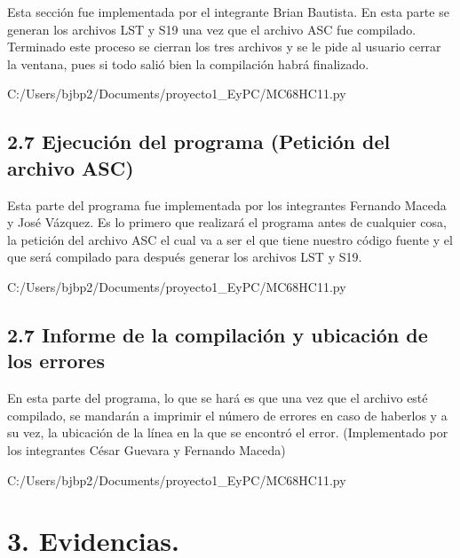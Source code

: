 \documentclass[letterpaper]{report}
\begin{document}
    Esta sección fue implementada por el integrante Brian Bautista. 
    En esta parte se generan los archivos LST y S19 una vez que el archivo ASC 
    fue compilado. Terminado este proceso se cierran los tres archivos y se le pide
    al usuario cerrar la ventana, pues si todo salió bien la compilación habrá
    finalizado.

    
    {C:/Users/bjbp2/Documents/proyecto1_EyPC/MC68HC11.py}

    \subsection*{2.7 Ejecuci\'on del programa (Petici\'on del archivo ASC)}
    
    Esta parte del programa fue implementada por los integrantes Fernando Maceda
    y Jos\'e Vázquez. Es lo primero que realizará el programa antes de cualquier 
    cosa, la petición del archivo ASC el cual va a ser el que tiene nuestro código
    fuente y el que será compilado para después generar los archivos LST y S19.

    
    {C:/Users/bjbp2/Documents/proyecto1_EyPC/MC68HC11.py}

    \subsection*{2.7 Informe de la compilaci\'on y ubicaci\'on de los errores}
    
    En esta parte del programa, lo que se hará es que una vez que el archivo esté
    compilado, se mandarán a imprimir el número de errores en caso de haberlos y a su
    vez, la ubicación de la línea en la que se encontró el error.
    (Implementado por los integrantes César Guevara y Fernando Maceda)


    
    {C:/Users/bjbp2/Documents/proyecto1_EyPC/MC68HC11.py}
    
    \newpage
                
    \section*{3. Evidencias.}
\end{document}
